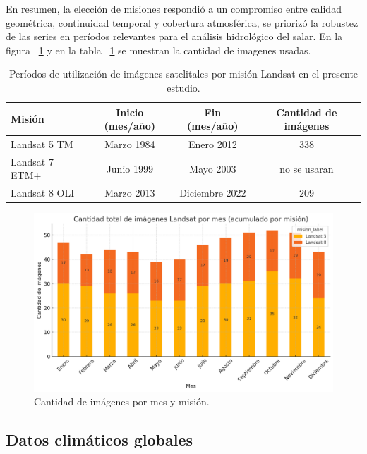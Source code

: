 En resumen, la elección de misiones respondió a un compromiso entre calidad geométrica, continuidad temporal y cobertura atmosférica, se priorizó la robustez de las series en períodos relevantes para el análisis hidrológico del salar. En la figura ~\ref{fig:cant_imagenes} y en la tabla ~\ref{tab:periodos_landsat} se muestran la cantidad de imagenes usadas. 


\begin{table}[h]
	\centering
	\caption[Períodos Landsat]{Períodos de utilización de imágenes satelitales por misión Landsat en el presente estudio.}
	\begin{tabular}{l c c c}    
		\toprule
		\textbf{Misión}     & \textbf{Inicio (mes/año)} & \textbf{Fin (mes/año)} & \textbf{Cantidad de imágenes} \\
		\midrule
		Landsat 5 TM        & Marzo 1984   & Enero 2012        & 338 \\		
		Landsat 7 ETM+      & Junio 1999   & Mayo 2003         & no se usaran \\
		Landsat 8 OLI       & Marzo 2013   & Diciembre 2022    & 209 \\
		\bottomrule
	\end{tabular}
        \hline
	\label{tab:periodos_landsat}
\end{table}

\begin{figure}[ht]
        \centering
        \includegraphics[scale=.4]
        {Figures/fig12.png}
        \caption{Cantidad de imágenes por mes y misión.}
        \label{fig:cant_imagenes}
\end{figure}

\subsection{Datos climáticos globales}

